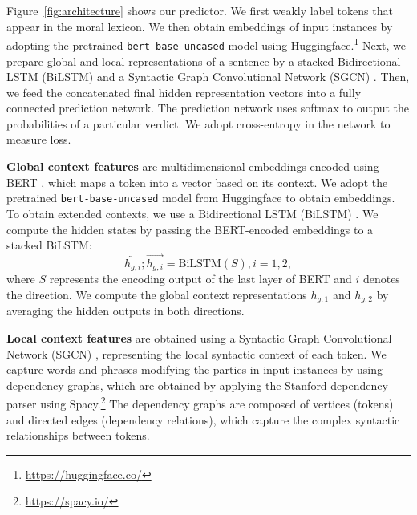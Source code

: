 \documentclass[letterpaper]{article} %
\begin{document}
Figure~\ref{fig:architecture} shows our predictor.
We first weakly label tokens that appear in the moral lexicon.
We then obtain embeddings of input instances by adopting the pretrained \texttt{bert-base-uncased} model using Huggingface.\footnote{\url{https://huggingface.co/}}
Next, we prepare global and local representations of a sentence by a stacked Bidirectional LSTM (BiLSTM) \cite{hochreiter-1997-lstm} and a Syntactic Graph Convolutional Network (SGCN) \cite{bastings-2017-graph, li-2021-powering}.
Then, we feed the concatenated final hidden representation vectors into a fully connected prediction network.
The prediction network uses softmax to output the probabilities of a particular verdict.
We adopt cross-entropy in the network to measure loss. 

\textbf{Global context features} are multidimensional embeddings encoded using BERT \cite{Devlin-2019-BERT}, which maps a token into a vector based on its context.
We adopt the pretrained \texttt{bert-base-uncased} model from Huggingface to obtain embeddings. 
To obtain extended contexts, we use a Bidirectional LSTM (BiLSTM) \cite{hochreiter-1997-lstm}.
We compute the hidden states by passing the BERT-encoded embeddings to a stacked BiLSTM:
\begin{equation}
\overleftarrow{h_{g,i}}; \overrightarrow{h_{g,i}}=\text{BiLSTM}(S), i=1,2,
\label{eq:1}
\end{equation}
where $S$ represents the encoding output of the last layer of BERT and $i$ denotes the direction.
We compute the global context representations $h_{g,1}$ and $h_{g,2}$ by averaging the hidden outputs in both directions.

\textbf{Local context features} are obtained using a Syntactic Graph Convolutional Network (SGCN) \cite{bastings-2017-graph, li-2021-powering}, representing the local syntactic context of each token.
We capture words and phrases modifying the parties in input instances by using dependency graphs, which are obtained by applying the Stanford dependency parser \cite{chen-2014-fast} using Spacy.\footnote{\url{https://spacy.io/}}
The dependency graphs are composed of vertices (tokens) and directed edges (dependency relations), which capture the complex syntactic relationships between tokens.
\end{document}
